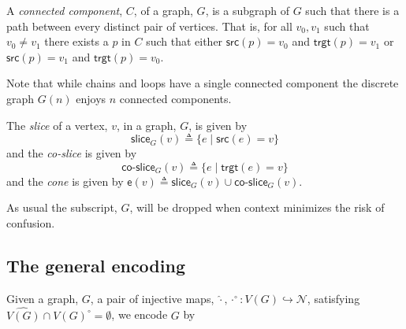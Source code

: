 \documentclass[]{llncs}
\begin{document}
\begin{definition}
  A \emph{connected component}, $C$, of a graph, $G$, is a subgraph of
  $G$ such that there is a path between every distinct pair of
  vertices. That is, for all $v_0, v_1$ such that $v_0 \neq v_1$ there
  exists a $p$ in $C$ such that either $\textsf{src}(p) = v_0$ and
  $\textsf{trgt}(p) = v_1$ or $\textsf{src}(p) = v_1$ and
  $\textsf{trgt}(p) = v_0$.
\end{definition}

\begin{remark}
  Note that while chains and loops have a single connected component
  the discrete graph $G(n)$ enjoys $n$ connected components.
\end{remark}

\begin{definition}
  The \emph{slice} of a vertex, $v$, in a graph, $G$, is given by
  \begin{equation}
    \textsf{slice}_{G}(v) \triangleq \{ e \; | \; \textsf{src}(e) = v \}
  \end{equation}
  and the \emph{co-slice} is given by
  \begin{equation}
    \textsf{co-slice}_{G}(v) \triangleq \{ e \; | \; \textsf{trgt}(e) = v \}
  \end{equation}
  and the \emph{cone} is given by $\textsf{e}(v) \triangleq \textsf{slice}_{G}(v) \cup \textsf{co-slice}_{G}(v)$.
\end{definition}

As usual the subscript, $G$, will be dropped when context minimizes
the risk of confusion.

\subsection{The general encoding}

Given a graph, $G$, a pair of injective maps,
$\widehat{\cdot},\cdot^{\circ}:V(G) \hookrightarrow \mathcal{N}$, satisfying
$\widehat{V(G)} \cap V(G)^{\circ} = \emptyset$, we encode $G$ by %

\end{document}
